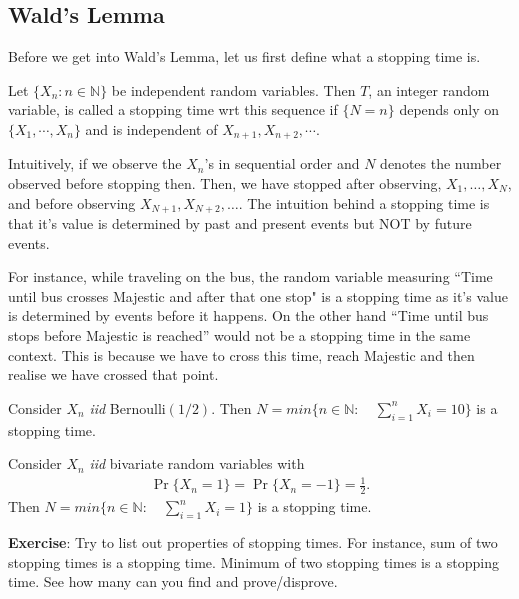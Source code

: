 \documentclass[a4paper,10pt, english]{article}
\begin{document}
\subsection{Wald's Lemma}
Before we get into Wald's Lemma, let us first define what a stopping time is.
\begin{defn}
Let $\{X_n: n\in \mathbb{N}\}$ be independent random variables. Then $T$, an integer random variable, is called a stopping time wrt this sequence if $\{N=n\}$ depends only on $\{X_1,\cdots,X_n\}$ and is independent of $X_{n+1}, X_{n+2},\cdots$. 
\end{defn}
Intuitively, if we observe the $X_n$'s in sequential order and $N$ denotes the number observed before stopping then. Then, we have stopped after observing, $X_1, \ldots, X_N$, and before observing $X_{N+1}, X_{N+2}, \ldots$. 
The intuition behind a stopping time is that it's value is determined by past and present events but NOT by future events. 
\begin{exmp}
For instance, while traveling on the bus, the random variable measuring ``Time until bus crosses Majestic and after that one stop" is a stopping time as it's value is determined by events before it happens. On the other hand ``Time until bus stops before Majestic is reached'' would not be a stopping time  in the same context. This is because we have to cross this time, reach Majestic and then realise we have crossed that point. 
\end{exmp}
\begin{exmp} Consider $X_n$ \emph{iid} Bernoulli$(1/2)$. Then $N = min \{n \in \mathbb{N}:\quad \sum_{i=1}^n X_i = 10\}$ is a stopping time.
\end{exmp}
\begin{exmp} Consider $X_n$ \emph{iid} bivariate random variables with 
\begin{align*}
\Pr\{X_n = 1\} = \Pr\{X_n = -1\} = \frac{1}{2}. 
\end{align*}
Then $N = min \{n \in \mathbb{N}:\quad \sum_{i=1}^n X_i = 1\}$ is a stopping time.
\end{exmp}

\textbf{Exercise}: Try to list out properties of stopping times. For instance, sum of two stopping times is a stopping time. Minimum of two stopping times is a stopping time. See how many can you find and prove/disprove.
\end{document}
